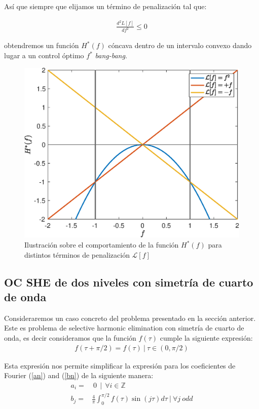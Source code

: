 Así que siempre que elijamos un término de penalización tal que:

\begin{gather}
    \frac{d^2L[f]}{df^2} \leq 0 
\end{gather}

obtendremos un función $H^*(f)$ cóncava dentro de un intervalo convexo dando lugar a un control óptimo $f^*$  \emph{bang-bang}.
\newline

\begin{figure}[!ht]
    \centering
    \includegraphics[scale=0.5]{img/bang-bang.eps}
    \caption{Ilustración sobre el comportamiento de la función $H^*(f)$ para distintos términos de penalización $\mathcal{L}[f]$}
\end{figure}


\subsection{OC SHE de dos niveles con simetría de cuarto de onda} 

Consideraremos un caso concreto del problema presentado en la sección anterior. Este es problema de selective harmonic elimination con simetría de cuarto de onda, es decir consideramos que la función $f(\tau)$ cumple la siguiente expresión:
\begin{gather}
    f(\tau + \pi/2)   = f(\tau)    \ | \ \tau \in (0,\pi/2)
\end{gather}

Esta expresión nos permite simplificar la expresión para los coeficientes de Fourier (\ref{an}) and (\ref{bn}) de la siguiente manera:
\begin{align}
    a_i = & \  0 \ \ | \  \ \forall i \in \mathbb{Z} \\
    b_j = &  \frac{4}{\pi} \int_0^{\pi/2} f(\tau ) \sin(j\tau)d\tau \ | \ \forall j \ odd
\end{align}

